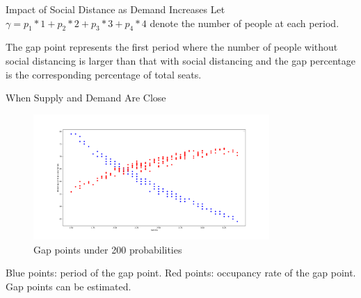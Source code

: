     \begin{frame}{Impact of Social Distance as Demand Increases}
        \scriptsize
        Let $\gamma = p_1 * 1 + p_2 * 2 + p_3 * 3 + p_4 * 4$ denote the number of people at each period.
        \begin{figure}[h]
            \centering
          \end{figure}
        \scriptsize
        The gap point represents the first period where the number of people without social distancing is larger than that with social distancing and the gap percentage is the corresponding percentage of total seats.
    \end{frame}
      
    \begin{frame}{When Supply and Demand Are Close}
      \begin{figure}[ht]
        \centering
        \includegraphics[width = 0.8\textwidth]{./images/scatter.pdf}
        \caption{Gap points under 200 probabilities}
    \end{figure}
    \scriptsize
    {\color{blue} Blue points}: period of the gap point.
    {\color{red} Red points}: occupancy rate of the gap point. 
    Gap points can be estimated.
    \end{frame}
